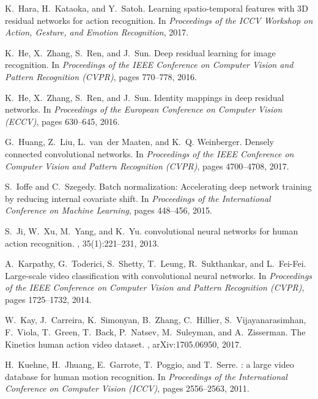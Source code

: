 \documentclass[10pt,twocolumn,letterpaper]{article}
\begin{document}
{\begin{thebibliography}{10}
  K.~Hara, H.~Kataoka, and Y.~Satoh.
  \newblock Learning spatio-temporal features with 3{D} residual networks for
    action recognition.
  \newblock In {\em Proceedings of the ICCV Workshop on Action, Gesture, and
    Emotion Recognition}, 2017.
  
  K.~He, X.~Zhang, S.~Ren, and J.~Sun.
  \newblock Deep residual learning for image recognition.
  \newblock In {\em Proceedings of the {IEEE} Conference on Computer Vision and
    Pattern Recognition (CVPR)}, pages 770--778, 2016.
  
  K.~He, X.~Zhang, S.~Ren, and J.~Sun.
  \newblock Identity mappings in deep residual networks.
  \newblock In {\em Proceedings of the European Conference on Computer Vision
    (ECCV)}, pages 630--645, 2016.
  
  G.~Huang, Z.~Liu, L.~van~der Maaten, and K.~Q. Weinberger.
  \newblock Densely connected convolutional networks.
  \newblock In {\em Proceedings of the IEEE Conference on Computer Vision and
    Pattern Recognition (CVPR)}, pages 4700--4708, 2017.
  
  S.~Ioffe and C.~Szegedy.
  \newblock Batch normalization: Accelerating deep network training by reducing
    internal covariate shift.
  \newblock In {\em Proceedings of the International Conference on Machine
    Learning}, pages 448--456, 2015.
  
  S.~Ji, W.~Xu, M.~Yang, and K.~Yu.
   convolutional neural networks for human action recognition.
  ,
    35(1):221--231, 2013.
  
  A.~Karpathy, G.~Toderici, S.~Shetty, T.~Leung, R.~Sukthankar, and L.~Fei-Fei.
  \newblock Large-scale video classification with convolutional neural networks.
  \newblock In {\em Proceedings of the IEEE Conference on Computer Vision and
    Pattern Recognition (CVPR)}, pages 1725--1732, 2014.
  
  W.~Kay, J.~Carreira, K.~Simonyan, B.~Zhang, C.~Hillier, S.~Vijayanarasimhan,
    F.~Viola, T.~Green, T.~Back, P.~Natsev, M.~Suleyman, and A.~Zisserman.
  \newblock The {K}inetics human action video dataset.
  , arXiv:1705.06950, 2017.
  
  H.~Kuehne, H.~Jhuang, E.~Garrote, T.~Poggio, and T.~Serre.
  : a large video database for human motion recognition.
  \newblock In {\em Proceedings of the International Conference on Computer
    Vision (ICCV)}, pages 2556--2563, 2011.
  

\end{thebibliography}}
\end{document}

